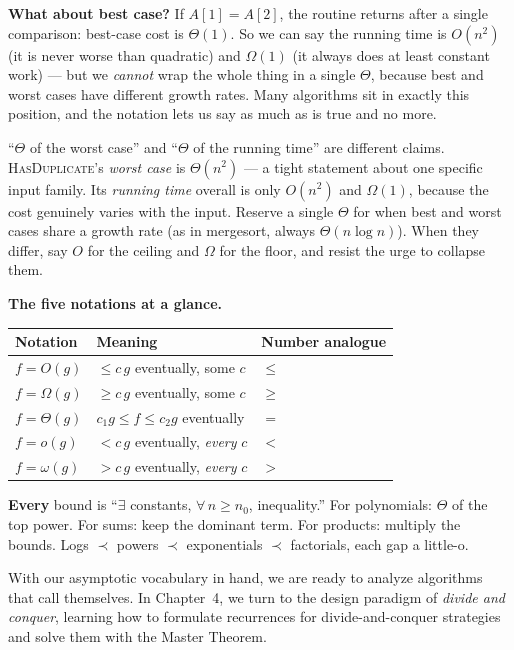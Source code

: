 \textbf{What about best case?} If $A[1] = A[2]$, the routine returns after a single
comparison: best-case cost is $\Theta(1)$. So we can say the running time is $O(n^2)$
(it is never worse than quadratic) and $\Omega(1)$ (it always does at least constant
work) --- but we \emph{cannot} wrap the whole thing in a single $\Theta$, because best
and worst cases have different growth rates. Many algorithms sit in exactly this
position, and the notation lets us say as much as is true and no more.

\begin{trapbox}
``$\Theta$ of the worst case'' and ``$\Theta$ of the running time'' are different
claims. \textsc{HasDuplicate}'s \emph{worst case} is $\Theta(n^2)$ --- a tight statement
about one specific input family. Its \emph{running time} overall is only $O(n^2)$ and
$\Omega(1)$, because the cost genuinely varies with the input. Reserve a single $\Theta$
for when best and worst cases share a growth rate (as in mergesort, always
$\Theta(n\log n)$). When they differ, say $O$ for the ceiling and $\Omega$ for the floor,
and resist the urge to collapse them.
\end{trapbox}

\begin{complexitybox}
\textbf{The five notations at a glance.}
\begin{center}
\begin{tabular}{lll}
\toprule
Notation & Meaning & Number analogue \\
\midrule
$f = O(g)$       & $\le c\,g$ eventually, some $c$        & $\le$ \\
$f = \Omega(g)$  & $\ge c\,g$ eventually, some $c$        & $\ge$ \\
$f = \Theta(g)$  & $c_1 g \le f \le c_2 g$ eventually     & $=$ \\
$f = o(g)$       & $< c\,g$ eventually, \emph{every} $c$  & $<$ \\
$f = \omega(g)$  & $> c\,g$ eventually, \emph{every} $c$  & $>$ \\
\bottomrule
\end{tabular}
\end{center}
\textbf{Every} bound is ``$\exists$ constants, $\forall\, n \ge n_0$, inequality.''
For polynomials: $\Theta$ of the top power. For sums: keep the dominant term. For
products: multiply the bounds. Logs $\prec$ powers $\prec$ exponentials $\prec$
factorials, each gap a little-o.
\end{complexitybox}

With our asymptotic vocabulary in hand, we are ready to analyze algorithms that call
themselves. In Chapter~4, we turn to the design paradigm of \emph{divide and conquer},
learning how to formulate recurrences for divide-and-conquer strategies and solve
them with the Master Theorem.

